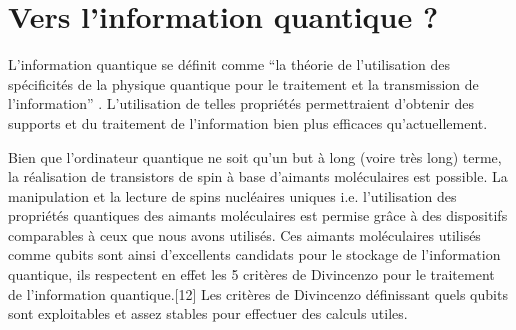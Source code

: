 \newpage
\section{Vers l'information quantique ?}

L'information quantique se définit comme “la théorie de l'utilisation des spécificités de la physique quantique pour le traitement et la transmission de l'information” \cite{18}. L'utilisation de telles propriétés permettraient d'obtenir des supports et du traitement de l'information bien plus efficaces qu'actuellement.

Bien que l'ordinateur quantique ne soit qu'un but à long (voire très long) terme, la réalisation de transistors de spin à base d'aimants moléculaires est possible. La manipulation et la lecture de spins nucléaires uniques i.e. l'utilisation des propriétés quantiques des aimants moléculaires est permise grâce à des dispositifs comparables à ceux que nous avons utilisés. Ces aimants moléculaires utilisés comme qubits sont ainsi d'excellents candidats pour le stockage de l'information quantique, ils respectent en effet les 5 critères de Divincenzo pour le traitement de l'information quantique.[12] Les critères de Divincenzo définissant quels qubits sont exploitables et assez stables pour effectuer des calculs utiles.
